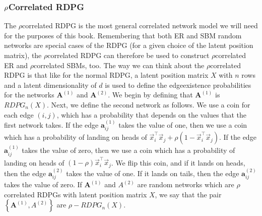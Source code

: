 \documentclass[letterpaper,10pt,english]{jupyterBook}
\begin{document}
\subsubsection{\protect\(\rho\protect\)\sphinxhyphen{}Correlated RDPG}
\label{\detokenize{representations/ch5/multi-network-models:rho-correlated-rdpg}}
\sphinxAtStartPar
The \(\rho\)\sphinxhyphen{}correlated RDPG is the most general correlated network model we will need for the purposes of this book. Remembering that both ER and SBM random networks are special cases of the RDPG (for a given choice of the latent position matrix), the \(\rho\)\sphinxhyphen{}correlated RDPG can therefore be used to construct \(\rho\)\sphinxhyphen{}correlated ER and \(\rho\)\sphinxhyphen{}correlated SBMs, too. The way we can think about the \(\rho\)\sphinxhyphen{}correlated RDPG is that like for the normal RDPG, a latent position matrix \(X\) with \(n\) rows and a latent dimensionality of \(d\) is used to define the edge\sphinxhyphen{}existence probabilities for the networks \(\mathbf A^{(1)}\) and \(\mathbf A^{(2)}\). We begin by defining that \(\mathbf A^{(1)}\) is \(RDPG_n(X)\). Next, we define the second network as follows. We use a coin for each edge \((i, j)\), which has a probability that depends on the values that the first network takes. If the edge \(\mathbf a_{ij}^{(1)}\) takes the value of one, then we use a coin which has a probability of landing on heads of \(\vec x_i^\top \vec x_j + \rho(1 - \vec x_i^\top \vec x_j)\). If the edge \(\mathbf a_{ij}^{(1)}\) takes the value of zero, then we use a coin which has a probability of landing on heads of \((1 - \rho)\vec x_i^\top \vec x_j\). We flip this coin, and if it lands on heads, then the edge \(\mathbf a_{ij}^{(2)}\) takes the value of one. If it lands on tails, then the edge \(\mathbf a_{ij}^{(2)}\) takes the value of zero. If \(\mathbf A^{(1)}\) and \(A^{(2)}\) are random networks which are \(\rho\)\sphinxhyphen{}correlated RDPGs with latent position matrix \(X\), we say that the pair \(\left\{\mathbf A^{(1)}, A^{(2)}\right\}\) are \(\rho-RDPG_n(X)\).
\end{document}
